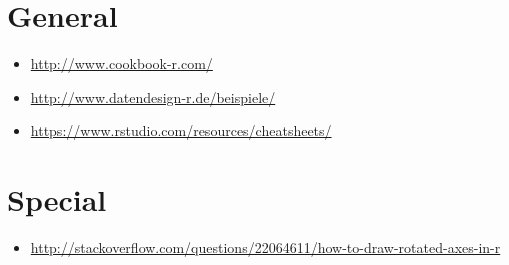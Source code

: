 \documentclass[a4paper, captions=tableheading]{tufte-book}
\begin{document}
\section{General}
\label{sec:orgheadline18}

\begin{itemize}
\item \url{http://www.cookbook-r.com/}
\item \url{http://www.datendesign-r.de/beispiele/}
\item \url{https://www.rstudio.com/resources/cheatsheets/}
\end{itemize}


\section{Special}
\label{sec:orgheadline19}

\begin{itemize}
\item \url{http://stackoverflow.com/questions/22064611/how-to-draw-rotated-axes-in-r}
\end{itemize}
\end{document}
